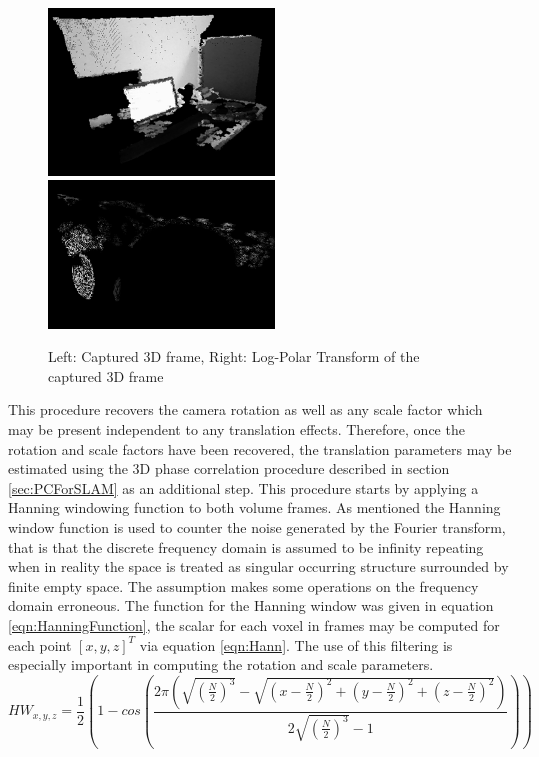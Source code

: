 \begin{figure}[!htb]
\centering
\includegraphics[width=6cm]{images/methodology/FVR/capFrameA}
\includegraphics[width=6cm]{images/methodology/FVR/capFrameLogPolar}
\caption{Left: Captured 3D frame, Right: Log-Polar Transform of the captured 3D frame}
\label{fig:LogPolarTransform3DExample}
\end{figure}

This procedure recovers the camera rotation as well as any scale factor which may be present independent to any translation effects. Therefore, once the rotation and scale factors have been recovered, the translation parameters may be estimated using the 3D phase correlation procedure described in section \ref{sec:PCForSLAM} as an additional step. This procedure starts by applying a Hanning windowing function to both volume frames. As mentioned the Hanning window function is used to counter the noise generated by the Fourier transform, that is that the discrete frequency domain is assumed to be infinity repeating when in reality the space is treated as singular occurring structure surrounded by finite empty space. The assumption makes some operations on the frequency domain erroneous. The function for the Hanning window was given in equation \ref{eqn:HanningFunction}, the scalar for each voxel in frames may be computed for each point $[x,y,z]^T$ via equation \ref{eqn:Hann}. The use of this filtering is especially important in computing the rotation and scale parameters. \\


\begin{equation} \label{eqn:Hann}
\scriptstyle
HW_{x,y,z} = \frac{1}{2}\left(
1 - cos \left(
\frac{2\pi
\left(
\sqrt{\left(\frac{N}{2}\right)^3} -
\sqrt{
\left(x-\frac{N}{2}\right)^2 + \left(y-\frac{N}{2}\right)^2 + \left(z-\frac{N}{2}\right)^2
}
\right)
}
{2\sqrt{\left(\frac{N}{2}\right)^3} - 1}
\right)
\right)
\end{equation}

